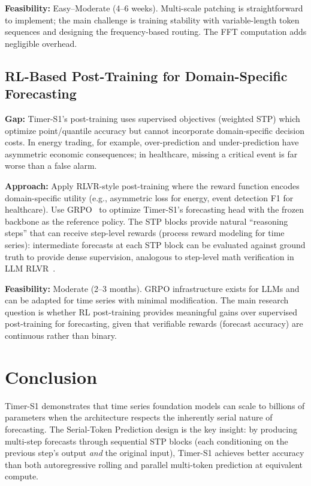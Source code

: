 \documentclass[11pt]{article}
\begin{document}
\textbf{Feasibility:} Easy--Moderate (4--6 weeks). Multi-scale patching is straightforward to implement; the main challenge is training stability with variable-length token sequences and designing the frequency-based routing. The FFT computation adds negligible overhead.

\subsection{RL-Based Post-Training for Domain-Specific Forecasting}

\textbf{Gap:} Timer-S1's post-training uses supervised objectives (weighted STP) which optimize point/quantile accuracy but cannot incorporate domain-specific decision costs. In energy trading, for example, over-prediction and under-prediction have asymmetric economic consequences; in healthcare, missing a critical event is far worse than a false alarm.

\textbf{Approach:} Apply RLVR-style post-training where the reward function encodes domain-specific utility (e.g., asymmetric loss for energy, event detection F1 for healthcare). Use GRPO~\citep{shao2024deepseekmath} to optimize Timer-S1's forecasting head with the frozen backbone as the reference policy. The STP blocks provide natural ``reasoning steps'' that can receive step-level rewards (process reward modeling for time series): intermediate forecasts at each STP block can be evaluated against ground truth to provide dense supervision, analogous to step-level math verification in LLM RLVR~\citep{zhang2026hacrl}.

\textbf{Feasibility:} Moderate (2--3 months). GRPO infrastructure exists for LLMs and can be adapted for time series with minimal modification. The main research question is whether RL post-training provides meaningful gains over supervised post-training for forecasting, given that verifiable rewards (forecast accuracy) are continuous rather than binary.

\section{Conclusion}

Timer-S1 demonstrates that time series foundation models can scale to billions of parameters when the architecture respects the inherently serial nature of forecasting. The Serial-Token Prediction design is the key insight: by producing multi-step forecasts through sequential STP blocks (each conditioning on the previous step's output \emph{and} the original input), Timer-S1 achieves better accuracy than both autoregressive rolling and parallel multi-token prediction at equivalent compute.
\end{document}
